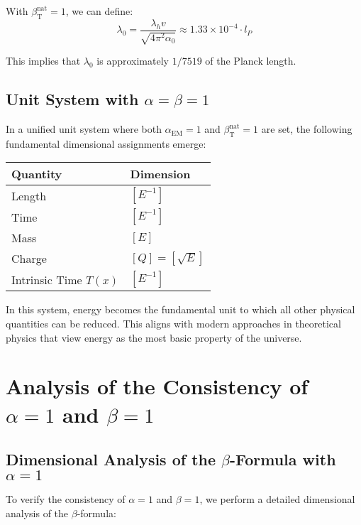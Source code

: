 ﻿\documentclass[12pt,a4paper]{article}
\newcommand{\Tfield}{T(x)}
\newcommand{\alphaEM}{\alpha_{\text{EM}}}
\newcommand{\betaT}{\beta_{\text{T}}}
\begin{document}
	With \(\betaT^{\text{nat}} = 1\), we can define:
	\begin{equation}
		\lambda_0 = \frac{\lambda_h v}{\sqrt{4\pi^2 \alpha_0}} \approx 1.33 \times 10^{-4} \cdot l_P
	\end{equation}
	
	This implies that \(\lambda_0\) is approximately \(1/7519\) of the Planck length.
	
	\subsection{Unit System with \(\alpha = \beta = 1\)}
	
	In a unified unit system where both \(\alphaEM = 1\) and \(\betaT^{\text{nat}} = 1\) are set, the following fundamental dimensional assignments emerge:
	
	\begin{tcolorbox}[colback=blue!5!white,colframe=blue!75!black,title=Dimensional Assignments in the Unified Unit System]
		\begin{tabular}{ll}
			\textbf{Quantity} & \textbf{Dimension} \\
			\hline
			Length & \([E^{-1}]\) \\
			Time & \([E^{-1}]\) \\
			Mass & \([E]\) \\
			Charge & \([Q] = [\sqrt{E}]\) \\
			Intrinsic Time \(\Tfield\) & \([E^{-1}]\) \\
		\end{tabular}
	\end{tcolorbox}
	
	In this system, energy becomes the fundamental unit to which all other physical quantities can be reduced. This aligns with modern approaches in theoretical physics that view energy as the most basic property of the universe.
	
	\section{Analysis of the Consistency of \(\alpha = 1\) and \(\beta = 1\)}
	
	\subsection{Dimensional Analysis of the \(\beta\)-Formula with \(\alpha = 1\)}
	
	To verify the consistency of \(\alpha = 1\) and \(\beta = 1\), we perform a detailed dimensional analysis of the \(\beta\)-formula:
	
\end{document}

